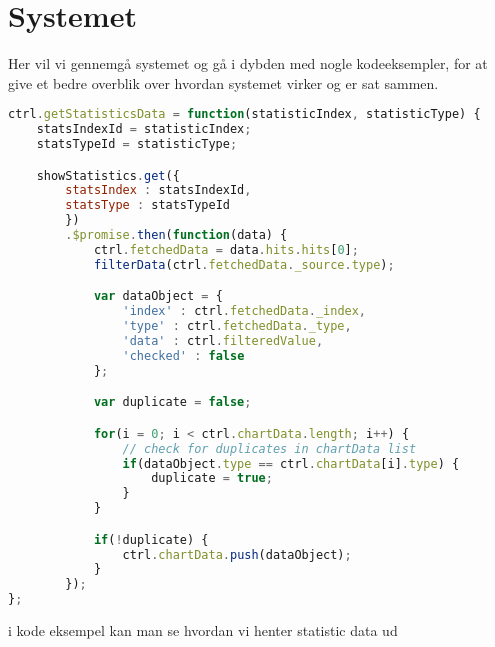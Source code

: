 \section{Systemet}
Her vil vi gennemgå systemet og gå i dybden med nogle kodeeksempler, for at give et bedre overblik over hvordan systemet virker og er sat sammen.
\begin{lstlisting}[caption={StatisticsController.spec.js}, language={JavaScript}, label={lst:StatisticsControllerData}]
ctrl.getStatisticsData = function(statisticIndex, statisticType) {
    statsIndexId = statisticIndex;
    statsTypeId = statisticType;

    showStatistics.get({
        statsIndex : statsIndexId,
        statsType : statsTypeId
        })
        .$promise.then(function(data) {
            ctrl.fetchedData = data.hits.hits[0];
            filterData(ctrl.fetchedData._source.type);

            var dataObject = {
                'index' : ctrl.fetchedData._index,
                'type' : ctrl.fetchedData._type,
                'data' : ctrl.filteredValue,
                'checked' : false
            };

            var duplicate = false;

            for(i = 0; i < ctrl.chartData.length; i++) {
                // check for duplicates in chartData list
                if(dataObject.type == ctrl.chartData[i].type) {
                    duplicate = true;
                }
            }

            if(!duplicate) {
                ctrl.chartData.push(dataObject);
            }
        });
};
\end{lstlisting}
i kode eksempel\label{lst:StatisticsControllerData} kan man se hvordan vi henter statistic data ud


